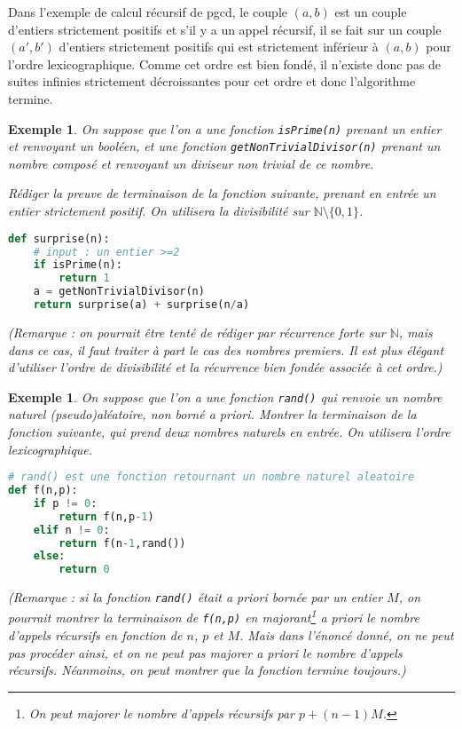 \documentclass[12pt]{article}
\newtheorem{exemple}[thm]{Exemple}
\newcommand{\N}{\mathbb{N}}
\begin{document}
Dans l'exemple de calcul récursif de pgcd, le couple $(a,b)$ est un couple d'entiers strictement positifs et s'il y a un appel récursif, il se fait sur un couple $(a',b')$ d'entiers strictement positifs qui est strictement inférieur à $(a,b)$ pour l'ordre lexicographique. 
Comme cet ordre est bien fondé, il n'existe donc pas de suites infinies strictement décroissantes pour cet ordre et donc l'algorithme termine.


\begin{exemple}
On suppose que l'on a une fonction \texttt{isPrime(n)} prenant  un entier et renvoyant un booléen, et une fonction \texttt{getNonTrivialDivisor(n)} prenant un nombre composé et renvoyant un diviseur non trivial de ce nombre.

Rédiger la preuve de terminaison de la fonction suivante, prenant en entrée un entier strictement positif. On utilisera la divisibilité sur $\N\setminus\{0,1\}$.
\begin{lstlisting}[language=Python]
def surprise(n):
	# input : un entier >=2 
	if isPrime(n):
		return 1
	a = getNonTrivialDivisor(n)
	return surprise(a) + surprise(n/a)
\end{lstlisting}
(Remarque : on pourrait être tenté de rédiger par récurrence forte sur $\N$, mais dans ce cas, il faut traiter à part le cas des nombres premiers. Il est plus élégant d'utiliser l'ordre de divisibilité et la récurrence bien fondée associée à cet ordre.)

\end{exemple}


\begin{exemple}%
On suppose que l'on a une fonction \texttt{rand()} qui renvoie un nombre naturel (pseudo)aléatoire, non borné a priori.
Montrer la terminaison de la fonction suivante, qui prend deux nombres naturels en entrée. On utilisera l'ordre lexicographique.
\begin{lstlisting}[language=Python]
# rand() est une fonction retournant un nombre naturel aleatoire
def f(n,p):
	if p != 0:
		return f(n,p-1)
	elif n != 0:
		return f(n-1,rand())
	else:
		return 0 
\end{lstlisting}
(Remarque : si la fonction \texttt{rand()} était a priori bornée par un entier $M$, on pourrait montrer la terminaison de \texttt{f(n,p)} en majorant\footnote{On peut majorer le nombre d'appels récursifs par $p + (n-1)M$.} a priori le nombre d'appels récursifs en fonction de $n$, $p$ et $M$.
Mais dans l'énoncé donné, on ne peut pas procéder ainsi, et on ne peut pas majorer a priori le nombre d'appels récursifs. Néanmoins, on peut montrer que la fonction termine toujours.)
\end{exemple}
\end{document}
